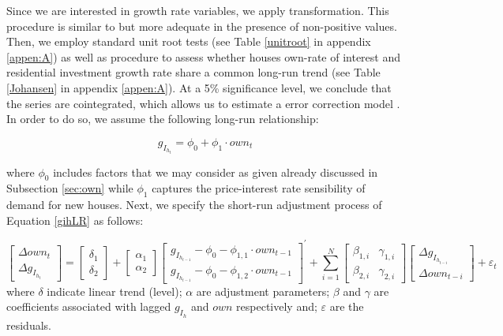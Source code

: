 \documentclass[12pt, a4paper]{article}
\begin{document}
Since we are interested in growth rate variables, we apply \textcite{yeo_new_2000} transformation.
This procedure is similar to \textcite{box_analysis_1964} but more adequate in the presence of non-positive values.
Then, we employ standard unit root tests (see Table \ref{unitroot} in appendix \ref{appen:A}) as well as \textcite{johansen_estimation_1991} procedure to assess whether houses own-rate of interest and residential investment growth rate share a common long-run trend (see Table \ref{Johansen} in appendix \ref{appen:A}).
At a 5\% significance level, we conclude that the series are cointegrated, which allows us to estimate a error correction model \cite{enders_applied_2014}.
In order to do so, we assume the following long-run relationship:

\begin{latex}
\begin{equation}
\label{gihLR}
g_{I_{h_{t}}} = \phi_{0} + \phi_{1}\cdot own_{t}
\end{equation}
\end{latex}
where \(\phi_0\) includes factors that we may consider as given already discussed in Subsection \ref{sec:own} while \(\phi_1\) captures the price-interest rate sensibility of demand for new houses.
Next, we specify the short-run adjustment process of Equation \ref{gihLR} as follows:

\begin{equation}
\label{matrix}
\begin{bmatrix}
\Delta own_{t}\\
\Delta g_{I_{h_{t}}}
\end{bmatrix} = \begin{bmatrix}\delta_{1}\\ \delta_{2}\end{bmatrix} + \begin{bmatrix}\alpha_{1}\\ \alpha_{2}\end{bmatrix} \begin{bmatrix}g_{I_{h_{t-1}}} - \phi_{0} - \phi_{1,1}\cdot own_{t-1}\\g_{I_{h_{t-1}}} - \phi_{0} - \phi_{1,2}\cdot own_{t-1}\end{bmatrix}^{\prime} + \sum^N_{i=1} \begin{bmatrix}\beta_{1,i} & \gamma_{1,i} \\\beta_{2,i} & \gamma_{2,i} \end{bmatrix} \begin{bmatrix}\Delta g_{I_{h_{t-i}}} \\\Delta own_{t-i}\end{bmatrix} + \varepsilon_{t}
\end{equation}
where \(\delta\) indicate linear trend (level);
\(\alpha\) are adjustment parameters;
\(\beta\) and \(\gamma\) are coefficients associated with lagged \(g_{I_h}\) and \(own\) respectively and; \(\varepsilon\) are the residuals.
\end{document}

